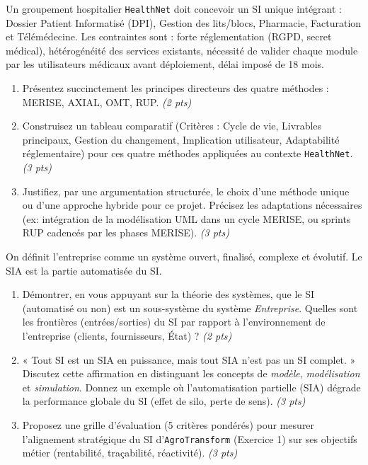 \documentclass[11pt]{article}
\begin{document}
\begin{exercice}
\label{exo:methodes}
Un groupement hospitalier \texttt{HealthNet} doit concevoir un SI unique intégrant : Dossier Patient Informatisé (DPI), Gestion des lits/blocs, Pharmacie, Facturation et Télémédecine. Les contraintes sont : forte réglementation (RGPD, secret médical), hétérogénéité des services existants, nécessité de valider chaque module par les utilisateurs médicaux avant déploiement, délai imposé de 18 mois.
\begin{enumerate}
    \item Présentez succinctement les principes directeurs des quatre méthodes : MERISE, AXIAL, OMT, RUP. \textit{(2 pts)}
    \item Construisez un tableau comparatif (Critères : Cycle de vie, Livrables principaux, Gestion du changement, Implication utilisateur, Adaptabilité réglementaire) pour ces quatre méthodes appliquées au contexte \texttt{HealthNet}. \textit{(3 pts)}
    \item Justifiez, par une argumentation structurée, le choix d'une méthode unique ou d'une approche hybride pour ce projet. Précisez les adaptations nécessaires (ex: intégration de la modélisation UML dans un cycle MERISE, ou sprints RUP cadencés par les phases MERISE). \textit{(3 pts)}
\end{enumerate}
\end{exercice}

\begin{exercice}
\label{exo:synthese}
On définit l'entreprise comme un système ouvert, finalisé, complexe et évolutif. Le SIA est la partie automatisée du SI.
\begin{enumerate}
    \item Démontrer, en vous appuyant sur la théorie des systèmes, que le SI (automatisé ou non) est un sous-système du système \textit{Entreprise}. Quelles sont les frontières (entrées/sorties) du SI par rapport à l'environnement de l'entreprise (clients, fournisseurs, État) ? \textit{(2 pts)}
    \item « Tout SI est un SIA en puissance, mais tout SIA n'est pas un SI complet. » Discutez cette affirmation en distinguant les concepts de \textit{modèle}, \textit{modélisation} et \textit{simulation}. Donnez un exemple où l'automatisation partielle (SIA) dégrade la performance globale du SI (effet de silo, perte de sens). \textit{(3 pts)}
    \item Proposez une grille d'évaluation (5 critères pondérés) pour mesurer l'alignement stratégique du SI d'\texttt{AgroTransform} (Exercice 1) sur ses objectifs métier (rentabilité, traçabilité, réactivité). \textit{(3 pts)}
\end{enumerate}
\end{exercice}
\end{document}
